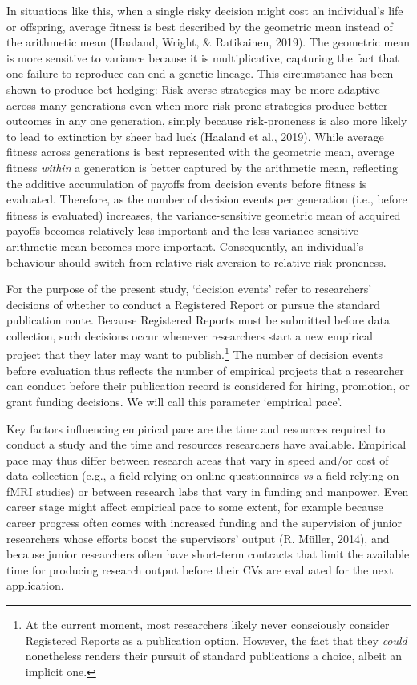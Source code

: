 \documentclass[
  ,man,mask,floatsintext]{apa6}
\begin{document}
In situations like this, when a single risky decision might cost an individual's life or offspring, average fitness is best described by the geometric mean instead of the arithmetic mean (Haaland, Wright, \& Ratikainen, 2019).
The geometric mean is more sensitive to variance because it is multiplicative, capturing the fact that one failure to reproduce can end a genetic lineage.
This circumstance has been shown to produce bet-hedging:
Risk-averse strategies may be more adaptive across many generations even when more risk-prone strategies produce better outcomes in any one generation, simply because risk-proneness is also more likely to lead to extinction by sheer bad luck (Haaland et al., 2019).
While average fitness across generations is best represented with the geometric mean, average fitness \emph{within} a generation is better captured by the arithmetic mean, reflecting the additive accumulation of payoffs from decision events before fitness is evaluated.
Therefore, as the number of decision events per generation (i.e., before fitness is evaluated) increases, the variance-sensitive geometric mean of acquired payoffs becomes relatively less important and the less variance-sensitive arithmetic mean becomes more important.
Consequently, an individual's behaviour should switch from relative risk-aversion to relative risk-proneness.

For the purpose of the present study, `decision events' refer to researchers' decisions of whether to conduct a Registered Report or pursue the standard publication route.
Because Registered Reports must be submitted before data collection, such decisions occur whenever researchers start a new empirical project that they later may want to publish.\footnote{At the current moment, most researchers likely never consciously consider Registered Reports as a publication option. However, the fact that they \emph{could} nonetheless renders their pursuit of standard publications a choice, albeit an implicit one.}
The number of decision events before evaluation thus reflects the number of empirical projects that a researcher can conduct before their publication record is considered for hiring, promotion, or grant funding decisions.
We will call this parameter `empirical pace'.

Key factors influencing empirical pace are the time and resources required to conduct a study and the time and resources researchers have available.
Empirical pace may thus differ between research areas that vary in speed and/or cost of data collection (e.g., a field relying on online questionnaires \emph{vs} a field relying on fMRI studies) or between research labs that vary in funding and manpower.
Even career stage might affect empirical pace to some extent, for example because career progress often comes with increased funding and the supervision of junior researchers whose efforts boost the supervisors' output (R. Müller, 2014), and because junior researchers often have short-term contracts that limit the available time for producing research output before their CVs are evaluated for the next application.
\end{document}
